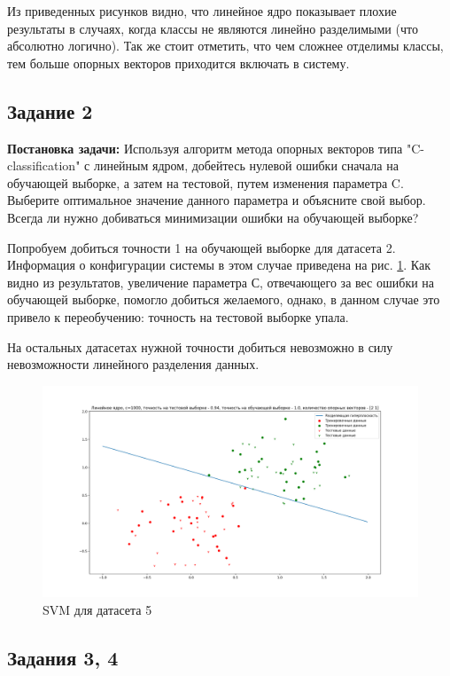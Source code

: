 \documentclass[a4paper,14pt]{article}
\begin{document}
Из приведенных рисунков видно, что линейное ядро показывает плохие результаты в случаях, когда классы не являются линейно разделимыми (что абсолютно логично). Так же стоит отметить, что чем сложнее отделимы классы, тем больше опорных векторов приходится включать в систему.

\subsection{Задание 2}

\textbf{Постановка задачи:}
Используя алгоритм метода опорных векторов типа "C-classification" с линейным ядром, добейтесь нулевой ошибки сначала на обучающей выборке, а затем на тестовой, путем изменения параметра C. Выберите оптимальное значение данного параметра и объясните свой выбор. Всегда ли нужно добиваться минимизации ошибки на обучающей выборке?

Попробуем добиться точности 1 на обучающей выборке для датасета 2. Информация о конфигурации системы в этом случае приведена на рис. \ref{graph:task_2_train_acc}. Как видно из результатов, увеличение параметра С, отвечающего за вес ошибки на обучающей выборке, помогло добиться желаемого, однако, в данном случае это привело к переобучению: точность на тестовой выборке упала.

На остальных датасетах нужной точности добиться невозможно в силу невозможности линейного разделения данных. 

\begin{figure}[H]
\includegraphics[width=\textwidth, keepaspectratio]{task_2c1000.png}
\caption{SVM для датасета 5}
\label{graph:task_2_train_acc}
\end{figure}

\subsection{Задания 3, 4}
\end{document}
